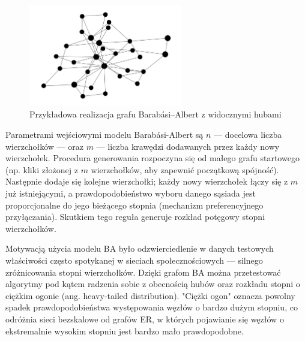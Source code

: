 \begin{figure}[h]
  \centering
  \includegraphics[width=0.6\textwidth]{assets/test_data/scalefree.png}
  \caption{Przykładowa realizacja grafu Barabási--Albert z widocznymi hubami}
  \label{fig:BA}
\end{figure}

Parametrami wejściowymi modelu Barabási-Albert są $n$ — docelowa liczba wierzchołków — oraz $m$ — liczba krawędzi dodawanych przez każdy nowy wierzchołek. Procedura generowania rozpoczyna się od małego grafu startowego (np. kliki złożonej z $m$ wierzchołków, aby zapewnić początkową spójność). Następnie dodaje się kolejne wierzchołki; każdy nowy wierzchołek łączy się z $m$ już istniejącymi, a prawdopodobieństwo wyboru danego sąsiada jest proporcjonalne do jego bieżącego stopnia (mechanizm preferencyjnego przyłączania). Skutkiem tego reguła generuje rozkład potęgowy stopni wierzchołków.

Motywacją użycia modelu BA było odzwierciedlenie w danych testowych właściwości często spotykanej w sieciach społecznościowych — silnego zróżnicowania stopni wierzchołków. Dzięki grafom BA można przetestować algorytmy pod kątem radzenia sobie z obecnością hubów oraz rozkładu stopni o ciężkim ogonie (ang. heavy-tailed distribution). "Ciężki ogon" oznacza powolny spadek prawdopodobieństwa występowania węzłów o bardzo dużym stopniu, co odróżnia sieci bezskalowe od grafów ER, w których pojawianie się węzłów o ekstremalnie wysokim stopniu jest bardzo mało prawdopodobne.

